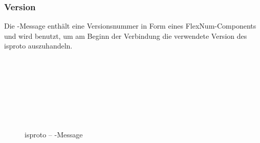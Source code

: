 \subsubsection{Version}
\label{dcl-isproto-version}
Die \isprotoversion-Message enthält eine Versionsnummer in Form eines FlexNum-Components und wird
benutzt, um am Beginn der Verbindung die verwendete Version des \gls{isproto} auszuhandeln.

\begin{figure}[tbh]
\begin{centering}

\begin{bytefield}[bitwidth=3em]{8}
	\\
	 \\
	
	\begin{rightwordgroup}{\isprotomsgtype}
	\end{rightwordgroup} \\
	
	\begin{rightwordgroup}{\isprotomsgdata}
		 \\
		\skippedwords \\
	\end{rightwordgroup}
	
\end{bytefield}

\par\end{centering}
\protect\caption{\gls*{isproto} -- \isprotoversion-Message}
\end{figure}


